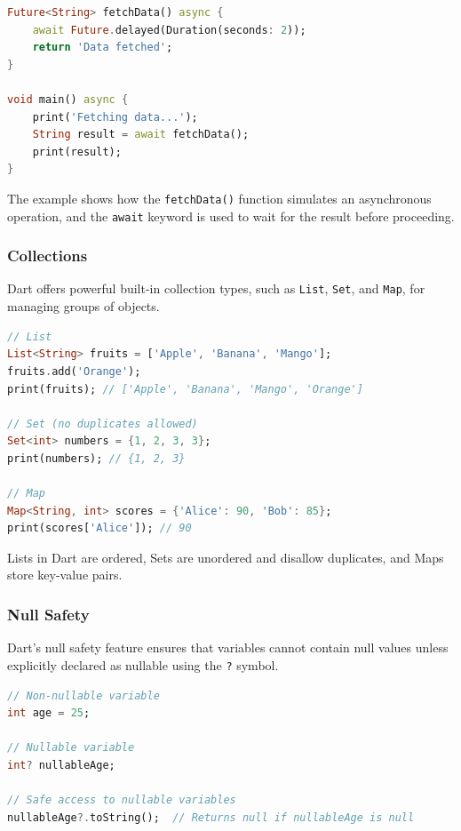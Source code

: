\documentclass[12pt,a4paper]{report}
\begin{document}
\begin{lstlisting}[language=Dart, caption={Asynchronous Programming in Dart}]
Future<String> fetchData() async {
    await Future.delayed(Duration(seconds: 2));
    return 'Data fetched';
}

void main() async {
    print('Fetching data...');
    String result = await fetchData();
    print(result);
}
\end{lstlisting}


The example shows how the \texttt{fetchData()} function simulates an asynchronous operation, and the \texttt{await} keyword is used to wait for the result before proceeding.

\subsubsection{Collections}
Dart offers powerful built-in collection types, such as \texttt{List}, \texttt{Set}, and \texttt{Map}, for managing groups of objects.

\begin{lstlisting}[language=Dart, caption={Collections in Dart}]
// List
List<String> fruits = ['Apple', 'Banana', 'Mango'];
fruits.add('Orange');
print(fruits); // ['Apple', 'Banana', 'Mango', 'Orange']

// Set (no duplicates allowed)
Set<int> numbers = {1, 2, 3, 3};
print(numbers); // {1, 2, 3}

// Map
Map<String, int> scores = {'Alice': 90, 'Bob': 85};
print(scores['Alice']); // 90
\end{lstlisting}

Lists in Dart are ordered, Sets are unordered and disallow duplicates, and Maps store key-value pairs.

\subsubsection{Null Safety}
Dart’s null safety feature ensures that variables cannot contain null values unless explicitly declared as nullable using the \texttt{?} symbol.

\begin{lstlisting}[language=Dart, caption={Null Safety in Dart}]
// Non-nullable variable
int age = 25;

// Nullable variable
int? nullableAge;

// Safe access to nullable variables
nullableAge?.toString();  // Returns null if nullableAge is null
\end{lstlisting}
\end{document}

